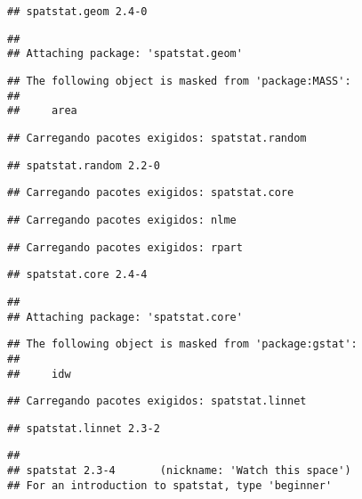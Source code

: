 \documentclass[
]{book}
\theoremstyle{definition}
\theoremstyle{definition}
\theoremstyle{definition}
\theoremstyle{definition}
\theoremstyle{remark}
\begin{document}
\begin{verbatim}
## spatstat.geom 2.4-0
\end{verbatim}

\begin{verbatim}
## 
## Attaching package: 'spatstat.geom'
\end{verbatim}

\begin{verbatim}
## The following object is masked from 'package:MASS':
## 
##     area
\end{verbatim}

\begin{verbatim}
## Carregando pacotes exigidos: spatstat.random
\end{verbatim}

\begin{verbatim}
## spatstat.random 2.2-0
\end{verbatim}

\begin{verbatim}
## Carregando pacotes exigidos: spatstat.core
\end{verbatim}

\begin{verbatim}
## Carregando pacotes exigidos: nlme
\end{verbatim}

\begin{verbatim}
## Carregando pacotes exigidos: rpart
\end{verbatim}

\begin{verbatim}
## spatstat.core 2.4-4
\end{verbatim}

\begin{verbatim}
## 
## Attaching package: 'spatstat.core'
\end{verbatim}

\begin{verbatim}
## The following object is masked from 'package:gstat':
## 
##     idw
\end{verbatim}

\begin{verbatim}
## Carregando pacotes exigidos: spatstat.linnet
\end{verbatim}

\begin{verbatim}
## spatstat.linnet 2.3-2
\end{verbatim}

\begin{verbatim}
## 
## spatstat 2.3-4       (nickname: 'Watch this space') 
## For an introduction to spatstat, type 'beginner'
\end{verbatim}
\end{document}
